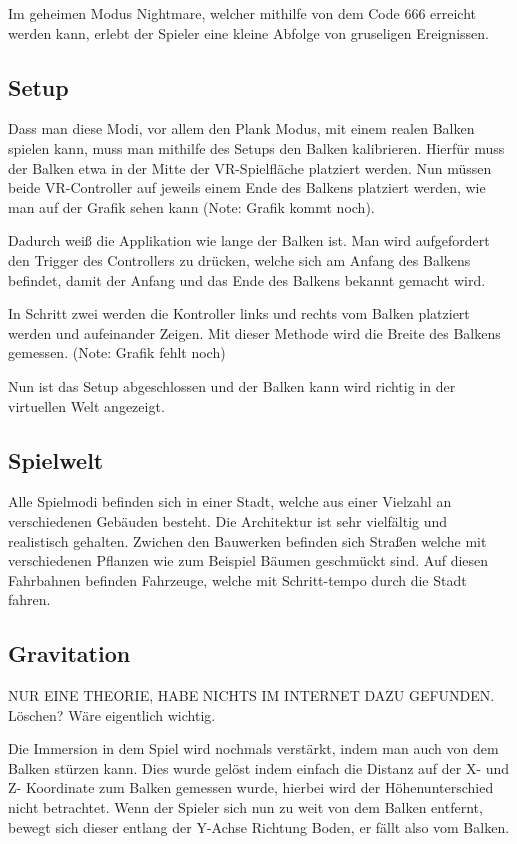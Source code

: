 Im geheimen Modus Nightmare, welcher mithilfe von dem Code 666 erreicht werden kann, erlebt der Spieler eine kleine Abfolge von gruseligen Ereignissen.

\subsection{Setup}
Dass man diese Modi, vor allem den Plank Modus, mit einem realen Balken spielen kann, muss man mithilfe des Setups den Balken kalibrieren.
Hierfür muss der Balken etwa in der Mitte der VR-Spielfläche platziert werden.
Nun müssen beide VR-Controller auf jeweils einem Ende des Balkens platziert werden, wie man auf der Grafik sehen kann (Note: Grafik kommt noch).

Dadurch weiß die Applikation wie lange der Balken ist.
Man wird aufgefordert den Trigger des Controllers zu drücken, welche sich am Anfang des Balkens befindet, damit der Anfang und das Ende des Balkens bekannt gemacht wird.


In Schritt zwei werden die Kontroller links und rechts vom Balken platziert werden und aufeinander Zeigen.
Mit dieser Methode wird die Breite des Balkens gemessen. (Note: Grafik fehlt noch)


Nun ist das Setup abgeschlossen und der Balken kann wird richtig in der virtuellen Welt angezeigt.

\subsection{Spielwelt}
Alle Spielmodi befinden sich in einer Stadt, welche aus einer Vielzahl an verschiedenen Gebäuden besteht.
Die Architektur ist sehr vielfältig und realistisch gehalten.
Zwichen den Bauwerken befinden sich Straßen welche mit verschiedenen Pflanzen wie zum Beispiel Bäumen geschmückt sind.
Auf diesen Fahrbahnen befinden Fahrzeuge, welche mit Schritt-tempo durch die Stadt fahren.

\subsection{Gravitation}
NUR EINE THEORIE, HABE NICHTS IM INTERNET DAZU GEFUNDEN. Löschen? Wäre eigentlich wichtig.

Die Immersion in dem Spiel wird nochmals verstärkt, indem man auch von dem Balken stürzen kann.
Dies wurde gelöst indem einfach die Distanz auf der X- und Z- Koordinate zum Balken gemessen wurde, hierbei wird der Höhenunterschied nicht betrachtet.
Wenn der Spieler sich nun zu weit von dem Balken entfernt, bewegt sich dieser entlang der Y-Achse Richtung Boden, er fällt also vom Balken.


%
%
%
%


%
%
